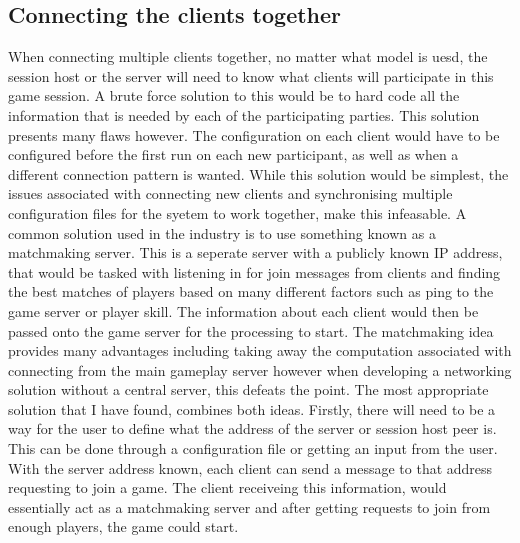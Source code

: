 \subsection{Connecting the clients together} \label{sec:client_connections}
When connecting multiple clients together, no matter what model is uesd, the session host or the server will need to know what clients will participate in this game session. A brute force solution to this would be to hard code all the information that is needed by each of the participating parties. This solution presents many flaws however. The configuration on each client would have to be configured before the first run on each new participant, as well as when a different connection pattern is wanted. While this solution would be simplest, the issues associated with connecting new clients and synchronising multiple configuration files for the syetem to work together, make this infeasable.
A common solution used in the industry is to use something known as a matchmaking server. This is a seperate server with a publicly known IP address, that would be tasked with listening in for join messages from clients and finding the best matches of players based on many different factors such as ping to the game server or player skill. The information about each client would then be passed onto the game server for the processing to start. The matchmaking idea provides many advantages including taking away the computation associated with connecting from the main gameplay server however when developing a networking solution without a central server, this defeats the point.
The most appropriate solution that I have found, combines both ideas. Firstly, there will need to be a way for the user to define what the address of the server or session host peer is. This can be done through a configuration file or getting an input from the user. With the server address known, each client can send a message to that address requesting to join a game. The client receiveing this information, would essentially act as a matchmaking server and after getting requests to join from enough players, the game could start.

